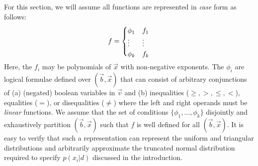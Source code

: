 \documentclass[letterpaper]{article}
\renewcommand{\-}{\text{-}}
\begin{document}
{For this section, we will assume all functions
are represented in \emph{case} form as follows:
\vspace{-1mm}
{%
\begin{align}
f = 
\begin{cases}
  \phi_1 & f_1 \\ 
  \vdots & \vdots \\ 
  \phi_k & f_k \\ 
  \vspace{-6mm}
\end{cases} \label{eq:case}
\end{align}
} 
Here, the $f_i$ may be polynomials of $\vec{x}$ with non-negative
exponents.  The $\phi_i$ are logical formulae defined over
$(\vec{b},\vec{x})$ that can consist of arbitrary conjunctions of (a)
(negated) boolean variables in $\vec{v}$ and (b) inequalities
($\geq,>,\leq,<$), equalities ($=$), or disequalities ($\neq$) where
the left and right operands must be \emph{linear} functions.  We
assume that the set of conditions $\{ \phi_1,\ldots,\phi_k \}$ 
disjointly and exhaustively partition $(\vec{b},\vec{x})$ such that $f$
is well defined for all $(\vec{b},\vec{x})$.  It is easy to verify
that such a representation can represent the uniform and triangular
distributions and arbitrarily approximate the truncated normal 
distribution required to specify $p(x_i|d)$ discussed in 
the introduction.


}
\end{document}
